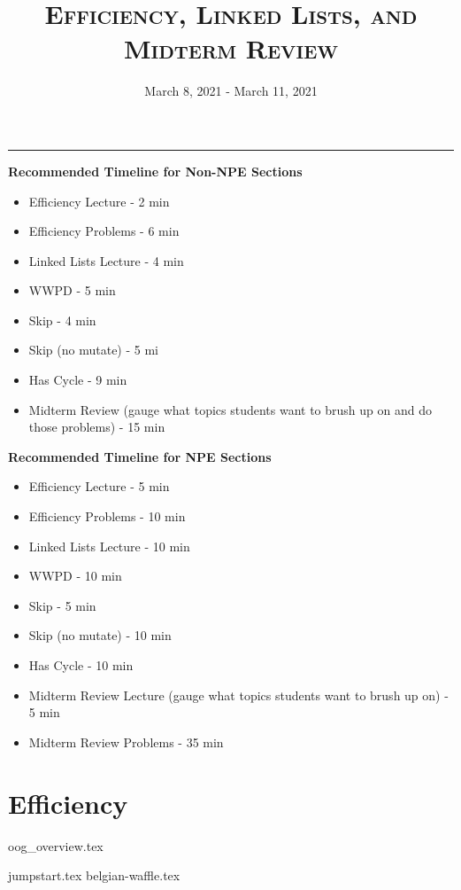 \documentclass{exam}
\title{\textsc{Efficiency, Linked Lists, and Midterm Review}}
\date{March 8, 2021 - March 11, 2021}
\begin{document}
\maketitle
\rule{\textwidth}{0.15em}
\fontsize{12}{15}\selectfont

\begin{guide}
\textbf{Recommended Timeline for Non-NPE Sections}
\begin{itemize}
    \item Efficiency Lecture - 2 min
    \item Efficiency Problems - 6 min
    \item Linked Lists Lecture - 4 min
    \item WWPD - 5 min
    \item Skip - 4 min
    \item Skip (no mutate) - 5 mi
    \item Has Cycle - 9 min
    \item Midterm Review (gauge what topics students want to brush up on and do those problems) - 15 min
\end{itemize}
\vspace{.5cm}
\textbf{Recommended Timeline for NPE Sections}
\begin{itemize}
    \item Efficiency Lecture - 5 min
    \item Efficiency Problems - 10 min
    \item Linked Lists Lecture - 10 min
    \item WWPD - 10 min
    \item Skip - 5 min
    \item Skip (no mutate) - 10 min
    \item Has Cycle - 10 min
    \item Midterm Review Lecture (gauge what topics students want to brush up on) - 5 min
    \item Midterm Review Problems - 35 min
\end{itemize}
\end{guide}

\section{Efficiency}
{oog_overview.tex}
\begin{questions}
{jumpstart.tex}
{belgian-waffle.tex}
\end{questions}
\end{document}
